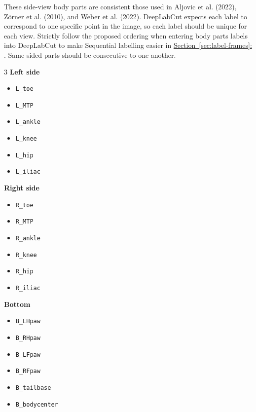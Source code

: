 \documentclass[11pt]{article}
\newcommand{\secref}[1]{\hyperref[#1]{Section~\ref*{#1}: \nameref*{#1}}}
\renewcommand{\[}{%
  \par\smallskip\noindent
  \begin{center}%
  \setlength{\fboxsep}{5pt}%
  \setlength{\fboxrule}{0.35pt}%
  \begin{lrbox}{\almaEquationBox}%
  $\displaystyle
}
\renewcommand{\]}{%
  $%
  \end{lrbox}%
  \fcolorbox{equationLine}{equationBack}{\usebox{\almaEquationBox}}%
  \end{center}%
  \smallskip\par
}
\begin{document}
These side-view body parts are consistent those used in Aljovic et al. (2022), Zörner et al. (2010), and Weber et al. (2022). DeepLabCut expects each label to correspond to one specific point in the image, so each label should be unique for each view. Strictly follow the proposed ordering when entering body parts labels into DeepLabCut to make Sequential labelling easier in \secref{sec:label-frames}. Same-sided parts should be consecutive to one another. 
\begin{tcolorbox}[
    data callout,
    title=\textbf{Recommended DeepLabCut Bodypart Labels}
]
\begin{multicols}{3}
\textbf{Left side}
\begin{itemize}
    \item \texttt{L\_toe}
    \item \texttt{L\_MTP}
    \item \texttt{L\_ankle}
    \item \texttt{L\_knee}
    \item \texttt{L\_hip}
    \item \texttt{L\_iliac}
\end{itemize}

\columnbreak

\textbf{Right side}
\begin{itemize}
    \item \texttt{R\_toe}
    \item \texttt{R\_MTP}
    \item \texttt{R\_ankle}
    \item \texttt{R\_knee}
    \item \texttt{R\_hip}
    \item \texttt{R\_iliac}
\end{itemize}

\columnbreak

\textbf{Bottom}
\begin{itemize}
    \item \texttt{B\_LHpaw}
    \item \texttt{B\_RHpaw}
    \item \texttt{B\_LFpaw}
    \item \texttt{B\_RFpaw}
    \item \texttt{B\_tailbase}
    \item \texttt{B\_bodycenter}
\end{itemize}
\end{multicols}
\end{tcolorbox}
\end{document}
